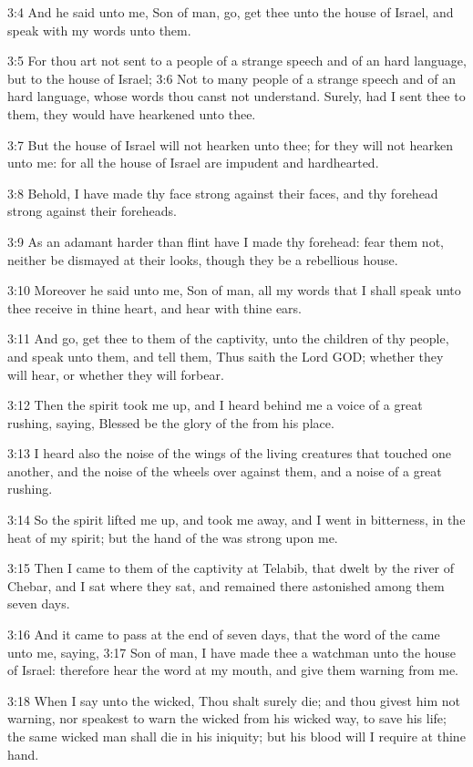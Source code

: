 3:4 And he said unto me, Son of man, go, get thee unto the house of Israel, and speak with my words unto them.

3:5 For thou art not sent to a people of a strange speech and of an hard language, but to the house of Israel; 3:6 Not to many people of a strange speech and of an hard language, whose words thou canst not understand. Surely, had I sent thee to them, they would have hearkened unto thee.

3:7 But the house of Israel will not hearken unto thee; for they will not hearken unto me: for all the house of Israel are impudent and hardhearted.

3:8 Behold, I have made thy face strong against their faces, and thy forehead strong against their foreheads.

3:9 As an adamant harder than flint have I made thy forehead: fear them not, neither be dismayed at their looks, though they be a rebellious house.

3:10 Moreover he said unto me, Son of man, all my words that I shall speak unto thee receive in thine heart, and hear with thine ears.

3:11 And go, get thee to them of the captivity, unto the children of thy people, and speak unto them, and tell them, Thus saith the Lord GOD; whether they will hear, or whether they will forbear.

3:12 Then the spirit took me up, and I heard behind me a voice of a great rushing, saying, Blessed be the glory of the \LORD from his place.

3:13 I heard also the noise of the wings of the living creatures that touched one another, and the noise of the wheels over against them, and a noise of a great rushing.

3:14 So the spirit lifted me up, and took me away, and I went in bitterness, in the heat of my spirit; but the hand of the \LORD was strong upon me.

3:15 Then I came to them of the captivity at Telabib, that dwelt by the river of Chebar, and I sat where they sat, and remained there astonished among them seven days.

3:16 And it came to pass at the end of seven days, that the word of the \LORD came unto me, saying, 3:17 Son of man, I have made thee a watchman unto the house of Israel: therefore hear the word at my mouth, and give them warning from me.

3:18 When I say unto the wicked, Thou shalt surely die; and thou givest him not warning, nor speakest to warn the wicked from his wicked way, to save his life; the same wicked man shall die in his iniquity; but his blood will I require at thine hand.

